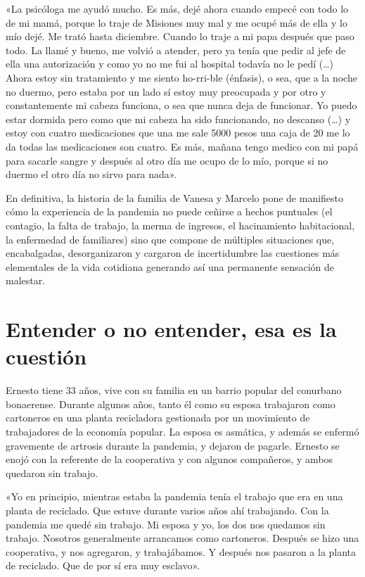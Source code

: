 \begin{refsection}
\begin{gbcita}
«La psicóloga me ayudó mucho. Es más, dejé ahora cuando empecé con todo lo de mi mamá, porque lo traje de Misiones muy mal y me ocupé más de ella y lo mío dejé. Me trató hasta diciembre. Cuando lo traje a mi papa después que paso todo. La llamé y bueno, me volvió a atender, pero ya tenía que pedir al jefe de ella una autorización y como yo no me fui al hospital todavía no le pedí (…) Ahora estoy sin tratamiento y me siento ho-rri-ble (énfasis), o sea, que a la noche no duermo, pero estaba por un lado sí estoy muy preocupada y por otro y constantemente mi cabeza funciona, o sea que nunca deja de funcionar. Yo puedo estar dormida pero como que mi cabeza ha sido funcionando, no descanso (…) y estoy con cuatro medicaciones que una me sale 5000 pesos una caja de 20 me lo da todas las medicaciones son cuatro. Es más, mañana tengo medico con mi papá para sacarle sangre y después al otro día me ocupo de lo mío, porque si no duermo el otro día no sirvo para nada».

\end{gbcita}

En definitiva, la historia de la familia de Vanesa y Marcelo pone de manifiesto cómo la experiencia de la pandemia no puede ceñirse a hechos puntuales (el contagio, la falta de trabajo, la merma de ingresos, el hacinamiento habitacional, la enfermedad de familiares) sino que compone de múltiples situaciones que, encabalgadas, desorganizaron y cargaron de incertidumbre las cuestiones más elementales de la vida cotidiana generando así una permanente sensación de malestar.


\section[Entender o no entender, esa es la cuestión]{Entender o no entender, esa es la cuestión}
\label{cap-25.entender-o-no-entender-esa-es-la-cuestion}
Ernesto tiene 33 años, vive con su familia en un barrio popular del conurbano bonaerense. Durante algunos años, tanto él como su esposa trabajaron como cartoneros en una planta recicladora gestionada por un movimiento de trabajadores de la economía popular. La esposa es asmática, y además se enfermó gravemente de artrosis durante la pandemia, y dejaron de pagarle. Ernesto se enojó con la referente de la cooperativa y con algunos compañeros, y ambos quedaron sin trabajo.


\begin{gbcita}
«Yo en principio, mientras estaba la pandemia tenía el trabajo que era en una planta de reciclado. Que estuve durante varios años ahí trabajando. Con la pandemia me quedé sin trabajo. Mi esposa y yo, los dos nos quedamos sin trabajo. Nosotros generalmente arrancamos como cartoneros. Después se hizo una cooperativa, y nos agregaron, y trabajábamos. Y después nos pasaron a la planta de reciclado. Que de por sí era muy esclavo».


\end{gbcita}
\end{refsection}
